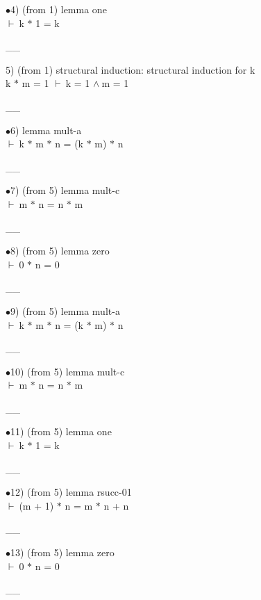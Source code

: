 \documentclass[a4paper]{article}
\newcommand{\Fol}{\mbox{$\vdash\ $}}
\newcommand{\And}{\mbox{$\wedge\ $}}
\begin{document}
$\bullet$4)  (from 1) lemma one \\
 \Fol k $*$ 1 = k

\vspace{-1.5ex}\_\hrulefill \_

5)  (from 1) structural induction: structural induction  for k\\
k $*$ m = 1 \Fol k = 1 \And m = 1

\vspace{-1.5ex}\_\hrulefill \_

$\bullet$6) lemma mult-a \\
 \Fol k $*$ m $*$ n = (k $*$ m) $*$ n

\vspace{-1.5ex}\_\hrulefill \_

$\bullet$7)  (from 5) lemma mult-c \\
 \Fol m $*$ n = n $*$ m

\vspace{-1.5ex}\_\hrulefill \_

$\bullet$8)  (from 5) lemma zero \\
 \Fol 0 $*$ n = 0

\vspace{-1.5ex}\_\hrulefill \_

$\bullet$9)  (from 5) lemma mult-a \\
 \Fol k $*$ m $*$ n = (k $*$ m) $*$ n

\vspace{-1.5ex}\_\hrulefill \_

$\bullet$10)  (from 5) lemma mult-c \\
 \Fol m $*$ n = n $*$ m

\vspace{-1.5ex}\_\hrulefill \_

$\bullet$11)  (from 5) lemma one \\
 \Fol k $*$ 1 = k

\vspace{-1.5ex}\_\hrulefill \_

$\bullet$12)  (from 5) lemma rsucc-01 \\
 \Fol (m + 1) $*$ n = m $*$ n + n

\vspace{-1.5ex}\_\hrulefill \_

$\bullet$13)  (from 5) lemma zero \\
 \Fol 0 $*$ n = 0

\vspace{-1.5ex}\_\hrulefill \_
\end{document}
